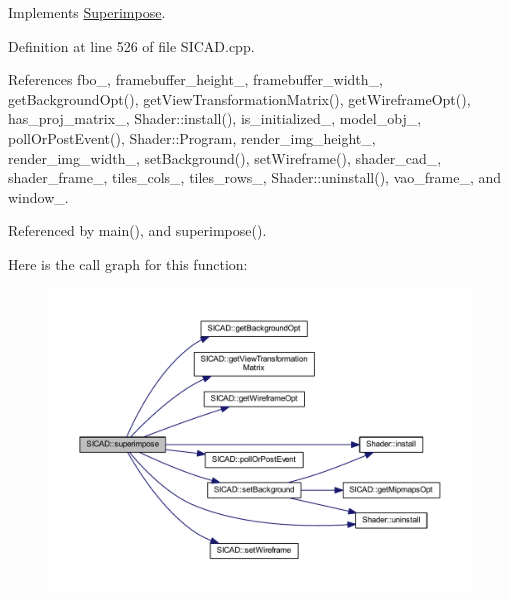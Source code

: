 Implements \mbox{\hyperlink{classSuperimpose_a62c4c269b8fc34cc36d3d54fa4acb35c}{Superimpose}}.



Definition at line 526 of file S\+I\+C\+A\+D.\+cpp.



References fbo\+\_\+, framebuffer\+\_\+height\+\_\+, framebuffer\+\_\+width\+\_\+, get\+Background\+Opt(), get\+View\+Transformation\+Matrix(), get\+Wireframe\+Opt(), has\+\_\+proj\+\_\+matrix\+\_\+, Shader\+::install(), is\+\_\+initialized\+\_\+, model\+\_\+obj\+\_\+, poll\+Or\+Post\+Event(), Shader\+::\+Program, render\+\_\+img\+\_\+height\+\_\+, render\+\_\+img\+\_\+width\+\_\+, set\+Background(), set\+Wireframe(), shader\+\_\+cad\+\_\+, shader\+\_\+frame\+\_\+, tiles\+\_\+cols\+\_\+, tiles\+\_\+rows\+\_\+, Shader\+::uninstall(), vao\+\_\+frame\+\_\+, and window\+\_\+.



Referenced by main(), and superimpose().

Here is the call graph for this function\+:
\nopagebreak
\begin{figure}[H]
\begin{center}
\leavevmode
\includegraphics[width=350pt]{classSICAD_a356e0ac8a0f130952a72326bedd4ab60_cgraph}
\end{center}
\end{figure}
\mbox{\label{classSICAD_ab15f84cec5a65c8dd6cad85f9b0e1993}} 
